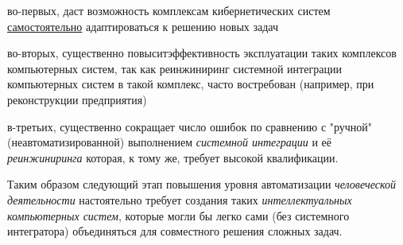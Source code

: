 {{\begin{scnitemize}
\item во-первых, даст возможность комплексам кибернетических систем \uline{самостоятельно} адаптироваться к решению новых задач
\item во-вторых, существенно повыситэффективность эксплуатации таких комплексов компьютерных систем, так как реинжиниринг системной интеграции компьютерных систем в такой комплекс, часто востребован (например, при реконструкции предприятия)
\item в-третьих, существенно сокращает число ошибок по сравнению с "ручной"{} (неавтоматизированной) выполнением \textit{системной интеграции} и её \textit{реинжиниринга} которая, к тому же, требует высокой квалификации.
\end{scnitemize}
Таким образом следующий этап повышения уровня автоматизации \textit{человеческой деятельности} настоятельно требует создания таких \textit{интеллектуальных компьютерных систем}, которые могли бы легко сами (без системного интегратора) объединяться для совместного решения сложных задач. 
}
}

